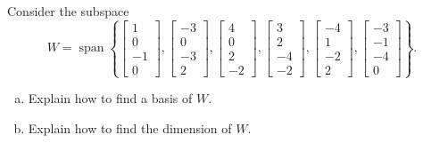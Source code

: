 
\begin{exerciseStatement}


Consider the subspace \[W=\operatorname{span}  \left\{ \left[\begin{array}{c}
1 \\
0 \\
-1 \\
0
\end{array}\right] , \left[\begin{array}{c}
-3 \\
0 \\
-3 \\
2
\end{array}\right] , \left[\begin{array}{c}
4 \\
0 \\
2 \\
-2
\end{array}\right] , \left[\begin{array}{c}
3 \\
2 \\
-4 \\
-2
\end{array}\right] , \left[\begin{array}{c}
-4 \\
1 \\
-2 \\
2
\end{array}\right] , \left[\begin{array}{c}
-3 \\
-1 \\
-4 \\
0
\end{array}\right] \right\} .\]


\begin{enumerate}[(a)]
\item  Explain how to find a basis of \(W\).
\item  Explain how to find the dimension of \(W\).
\end{enumerate}
    
\end{exerciseStatement}
    

